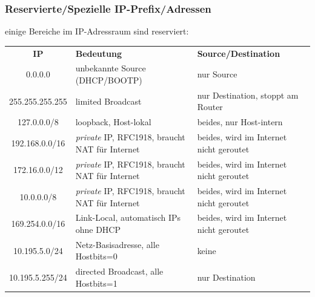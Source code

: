 \documentclass{beamer}
\begin{document}
\begin{frame}
\frametitle{Reservierte/Spezielle IP-Prefix/Adressen}
einige Bereiche im IP-Adressraum sind reserviert:
\begin{small}
\begin{center}
\begin{tabular}{|c|l|l|}
\hline 
\textbf{IP} & \textbf{Bedeutung} & \textbf{Source/Destination} \\
0.0.0.0 & unbekannte Source \tiny{(DHCP/BOOTP)} & nur Source \\
255.255.255.255 & limited Broadcast & nur Destination\tiny{, stoppt am Router} \\
127.0.0.0/8 & loopback\tiny{, Host-lokal} & beides, nur Host-intern \\
192.168.0.0/16 & {\em private} IP\tiny{, RFC1918, braucht NAT f\"ur Internet} & beides\tiny{, wird im Internet nicht geroutet} \\
172.16.0.0/12 & {\em private} IP\tiny{, RFC1918, braucht NAT f\"ur Internet} & beides\tiny{, wird im Internet nicht geroutet} \\
10.0.0.0/8 & {\em private} IP\tiny{, RFC1918, braucht NAT f\"ur Internet} & beides\tiny{, wird im Internet nicht geroutet} \\
169.254.0.0/16 & Link-Local\tiny{, automatisch IPs ohne DHCP} & beides\tiny{, wird im Internet nicht geroutet} \\
\hline
10.195.5.0/24 & Netz-Basisadresse\tiny{, alle Hostbits=0} & keine \\
10.195.5.255/24 & directed Broadcast\tiny{, alle Hostbits=1} & nur Destination \\
\hline 
\end{tabular}
\end{center}
\end{small}
\\
\\
\end{frame}
\end{document}
